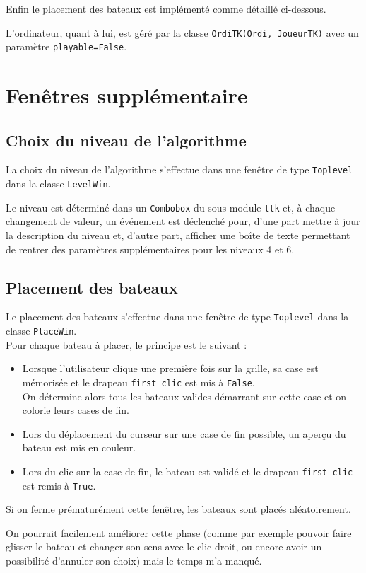 Enfin le placement des bateaux est implémenté comme détaillé ci-dessous.

\medskip

L'ordinateur, quant à lui, est géré par la classe \texttt{OrdiTK(Ordi, JoueurTK)} avec un paramètre \texttt{playable=False}.

\section{Fenêtres supplémentaire}
\subsection{Choix du niveau de l'algorithme}
La choix du niveau de l'algorithme s'effectue dans une fenêtre de type \texttt{Toplevel} dans la classe \texttt{LevelWin}.

Le niveau est déterminé dans un \texttt{Combobox} du sous-module \texttt{ttk} et, à chaque changement de valeur, un événement est déclenché pour, d'une part mettre à jour la description du niveau et, d'autre part, afficher une boîte de texte permettant de rentrer des paramètres supplémentaires pour les niveaux 4 et 6.

\subsection{Placement des bateaux}
Le placement des bateaux s'effectue dans une fenêtre de type \texttt{Toplevel} dans la classe \texttt{PlaceWin}.\\
Pour chaque bateau à placer, le principe est le suivant :
\begin{itemize}
\item Lorsque l'utilisateur clique une première fois sur la grille, sa case est mémorisée et le drapeau \texttt{first\_clic} est mis à \texttt{False}.\\
On détermine alors tous les bateaux valides démarrant sur cette case et on colorie leurs cases de fin.
\item  Lors du déplacement du curseur sur une case de fin possible, un aperçu du bateau est mis en couleur.
\item Lors du clic sur la case de fin, le bateau est validé et le drapeau \texttt{first\_clic} est remis à \texttt{True}.
\end{itemize}
Si on ferme prématurément cette fenêtre, les bateaux sont placés aléatoirement.

\medskip

On pourrait facilement améliorer cette phase (comme par exemple pouvoir faire glisser le bateau et changer son sens avec le clic droit, ou encore avoir un possibilité d'annuler son choix) mais le temps m'a manqué.
